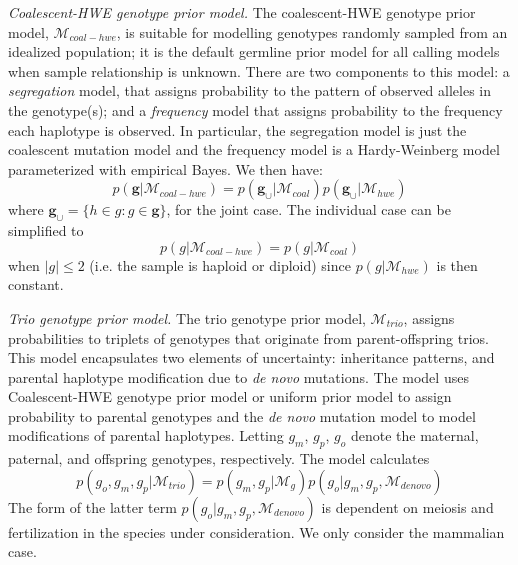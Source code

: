\documentclass[notitlepage, twocolumn, 10pt]{article}
\begin{document}
\vspace{3mm}
\noindent\emph{Coalescent-HWE genotype prior model.} The coalescent-HWE genotype prior model, $\mathcal{M}_{coal-hwe}$, is suitable for modelling genotypes randomly sampled from an idealized population; it is the default germline prior model for all calling models when sample relationship is unknown. There are two components to this model: a \emph{segregation} model, that assigns probability to the pattern of observed alleles in the genotype(s); and a \emph{frequency} model that assigns probability to the frequency each haplotype is observed. In particular, the segregation model is just the coalescent mutation model and the frequency model is a Hardy-Weinberg model parameterized with empirical Bayes. We then have:
\begin{equation*}
    p(\boldsymbol{g} | \mathcal{M}_{coal-hwe}) = p(\boldsymbol{g}_{\cup} | \mathcal{M}_{coal}) p(\boldsymbol{g}_{\cup} | \mathcal{M}_{hwe})
\end{equation*}
where $\boldsymbol{g}_{\cup} = \{h \in g : g \in \boldsymbol{g}\}$, for the joint case. The individual case can be simplified to
\begin{equation*}
    p(g | \mathcal{M}_{coal-hwe}) = p(g | \mathcal{M}_{coal})
\end{equation*}
when $|g| \le 2$ (i.e. the sample is haploid or diploid) since $p(g | \mathcal{M}_{hwe})$ is then constant.

\vspace{3mm}
\noindent\emph{Trio genotype prior model.} The trio genotype prior model, $\mathcal{M}_{trio}$, assigns probabilities to triplets of genotypes that originate from parent-offspring trios. This model encapsulates two elements of uncertainty: inheritance patterns, and parental haplotype modification due to \textit{de novo} mutations. The model uses Coalescent-HWE genotype prior model or uniform prior model to assign probability to parental genotypes and the \emph{de novo} mutation model to model modifications of parental haplotypes. Letting $g_m$, $g_p$, $g_o$ denote the maternal, paternal, and offspring genotypes, respectively. The model calculates
\begin{equation*}
    p(g_o, g_m, g_p | \mathcal{M}_{trio}) = p(g_m, g_p | \mathcal{M}_{g}) p(g_o | g_m, g_p, \mathcal{M}_{denovo})
\end{equation*}
The form of the latter term $p(g_o | g_m, g_p, \mathcal{M}_{denovo})$ is dependent on meiosis and fertilization in the species under consideration. We only consider the mammalian case.
\end{document}
